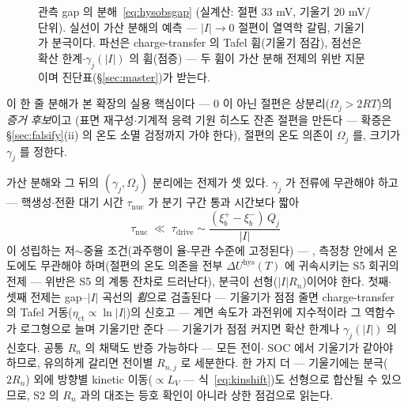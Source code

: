 \documentclass[11pt,a4paper]{article}
\newcommand{\hys}{\mathrm{hys}}
\newcommand{\obs}{\mathrm{obs}}
\begin{document}
\begin{figure}[t]
\centering
{}
\caption{관측 gap 의 분해~\eqref{eq:hysobsgap} (실계산: 절편 $33$ mV, 기울기 $20$ mV/단위).
실선이 가산 분해의 예측 — $|I|\to0$ 절편이 열역학 갈림, 기울기가 분극이다. 파선은 charge-transfer
의 Tafel 휨(기울기 점감), 점선은 확산 한계$\cdot$$\gamma_j(|I|)$ 의 휨(점증) — 두 휨이 가산 분해
전제의 위반 지문이며 진단표(\S\ref{sec:master})가 받는다.}
\label{fig:gapI}
\end{figure}
 이 한 줄
분해가 본 확장의 실용 핵심이다 — $0$ 이 아닌 절편은 상분리($\Omega_j>2RT$)의 \emph{증거 후보}이고
(표면 재구성$\cdot$기계적 응력 기원 히스도 잔존 절편을 만든다 — 확증은 \S\ref{sec:falsify}(ii) 의
온도 소멸 검정까지 가야 한다), 절편의 온도 의존이 $\Omega_j$ 를, 크기가 $\gamma_j$ 를 정한다.

가산 분해와 그 뒤의 $(\gamma_j,\Omega_j)$ 분리에는 전제가 셋 있다. $\gamma_j$ 가 전류에 무관해야
하고 — 핵생성$\cdot$전환 대기 시간 $\tau_{\mathrm{nuc}}$ 가 분기 구간 통과 시간보다 짧아
\begin{equation*}
\tau_{\mathrm{nuc}}\;\ll\;\tau_{\mathrm{drive}}
\sim\frac{(\xi_b^+-\xi_b^-)\,Q_j}{|I|}
\end{equation*}
이 성립하는 저$\sim$중율 조건(과주행이 율-무관 수준에 고정된다) — , 측정창 안에서 온도에도 무관해야
하며(절편의 온도 의존을 전부 $\Delta U^\hys(T)$ 에 귀속시키는
S5 회귀의 전제 — 위반은 S5 의 계통 잔차로 드러난다), 분극이 선형($|I|R_n$)이어야 한다. 첫째$\cdot$
셋째 전제는 gap--$|I|$ 곡선의 \emph{휨}으로 검출된다 — 기울기가 점점 줄면 charge-transfer 의 Tafel 거동($\eta_{\mathrm{ct}}\propto\ln|I|$)의 신호고
— 계면 속도가 과전위에 지수적이라 그 역함수가 로그형으로 늘며 기울기만 준다 — 기울기가 점점
커지면 확산 한계나 $\gamma_j(|I|)$ 의 신호다. 공통 $R_n$ 의 채택도 반증 가능하다 — 모든 전이$\cdot$
SOC 에서 기울기가 같아야 하므로, 유의하게 갈리면 전이별 $R_{n,j}$ 로 세분한다. 한 가지 더 — 기울기에는
분극($2R_n$) 외에 방향별 kinetic 이동($\propto L_V$ — 식~\eqref{eq:kinshift})도 선형으로 합산될
수 있으므로, S2 의 $R_n$ 과의 대조는 등호 확인이 아니라 상한 점검으로 읽는다.
\end{document}
